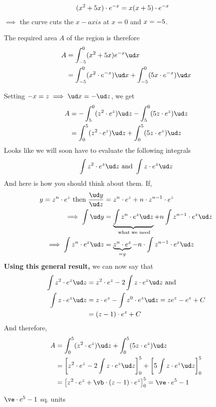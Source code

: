 \begin{solution}[\fullpage]
 \begin{align}
    (x^2+5 x)\cdot e^{-x} &= x(x+5)\cdot e^{-x}
 \end{align}
 $\implies$ the curve cuts the $x-axis$ at $x=0$ and $x=-5$.
 
 The required area $A$ of the region is therefore
 \begin{align}
    A &= \int_{-\va}^0(x^2+\va x)e^{-x}\ud x \\
      &= \int_{-\va}^0 (x^2\cdot e^{-x})\ud x + \int_{-\va}^0 (\va x\cdot e^{-x})\ud x
  \end{align}
  
  Setting $-x = z\implies \ud x = -\ud z$, we get 
  \begin{align}
    A &= -\int_{\va}^0(z^2\cdot e^z)\ud z - \int_{\va}^0 (\va z\cdot e^z)\ud z \\
      &= \int_0^{\va}(z^2\cdot e^z)\ud z + \int_0^{\va} (\va z\cdot e^z)\ud z
  \end{align}
  Looks like we will soon have to evaluate the following integrals 
  \[ \int z^2\cdot e^z\ud z\text{ and } \int z\cdot e^z\ud z \]
  And here is how you should think about them. If, 
  \begin{align}
    y = z^n\cdot e^z\text{ then }\dfrac{\ud y}{\ud z} &= z^n\cdot e^z + n\cdot z^{n-1}\cdot e^z \\
    \implies \int\ud y &= \underbrace{\int z^n\cdot e^z\ud z}_{\text{ what we need}} + 
    n\int z^{n-1}\cdot e^z\ud z \\
    \implies \int z^n\cdot e^z\ud z &= \underbrace{z^n\cdot e^z}_{=y} - n\cdot\int z^{n-1}\cdot e^z\ud z
  \end{align}
  \textbf{Using this general result,} we can now say that 
  \begin{align}
    \int z^2\cdot e^z\ud z &= z^2\cdot e^z -2\int z\cdot e^z\ud z \text{ and } \\
    \int z\cdot e^z\ud z &= z\cdot e^z - \int z^0\cdot e^z\ud z = ze^z - e^z + C \\
    &= (z-1)\cdot e^z + C 
  \end{align}
  And therefore, 
  \begin{align}
    A &= \int_0^{\va}(z^2\cdot e^z)\ud z + \int_0^{\va} (\va z\cdot e^z)\ud z \nonumber\\
      &= \left[ z^2\cdot e^z - 2\int z\cdot e^z\ud z \right]_0^{\va} 
      + \left[ \va\int z\cdot e^z\ud z \right]_0^{\va} \\ 
      &= \left[ z^2\cdot e^z + \vb\cdot (z-1)\cdot e^z \right]_0^{\va} = \ve\cdot e^{\va} - 1
  \end{align}
\end{solution}

\ifprintanswers\begin{codex}$\ve\cdot e^{\va} - 1$ sq. units\end{codex}\fi
